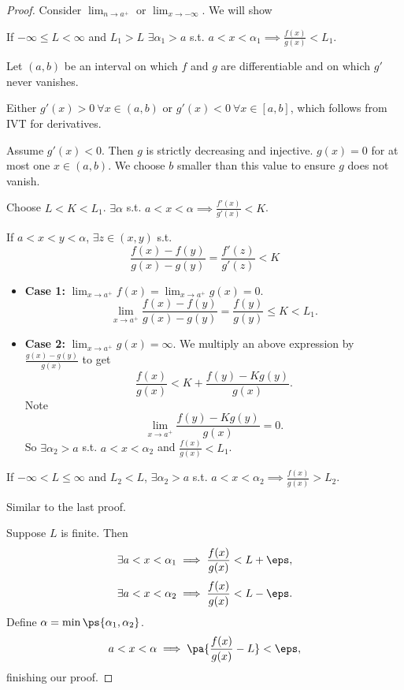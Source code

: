 \documentclass[11pt]{scrartcl}
\numberwithin{equation}{section}
\begin{document}
\begin{proof}
    Consider $\lim_{n\rightarrow a^+}$ or $\lim_{x\rightarrow -\infty}$.
    We will show 
    \begin{claim}
        If $-\infty\leq L< \infty$ and $L_1> L$
        $\exists \alpha_1>a$ s.t. $a<x<\alpha_1 \implies \frac{f(x)}{g(x)}<L_1$.
    \end{claim}
    \begin{subproof}
        Let $(a,b)$ be an interval on which $f$ and $g$ are differentiable
        and on which $g'$ never vanishes.

        Either $g'(x) > 0 \ \forall x\in(a,b)$ or $g'(x) < 0 \ \forall x\in[a,b]$, which follows from IVT for derivatives.

        Assume $g'(x)<0$. Then $g$ is strictly decreasing and injective.
        $g(x) = 0$ for at most one $x\in (a,b)$.
        We choose $b$ smaller than this value to ensure $g$ does not 
        vanish.

        Choose $L<K<L_1$. $\exists \alpha$ s.t. $a<x<\alpha\implies \frac{f'(x)}{g'(x)}<K$.

        If $a<x<y<\alpha$, $\exists z\in(x,y)$ s.t. 
        \[
            \frac{f(x)-f(y)}{g(x)-g(y)} = \frac{f'(z)}{g'(z)} < K
        \]
        \begin{itemize}
            \item \textbf{Case 1:} $\lim_{x\rightarrow a^+}f(x)=\lim_{x\rightarrow a^+}g(x) = 0$.
            \[
                \lim_{x\rightarrow a^+}\frac{f(x)-f(y)}{g(x)-g(y)} = \frac{f(y)}{g(y)} \leq K < L_1.
            \]
            \item \textbf{Case 2:} $\lim_{x\rightarrow a^+}g(x) = \infty$.
            We multiply an above expression by $\frac{g(x)-g(y)}{g(x)}$ to 
            get 
            \[
                \frac{f(x)}{g(x)} < K + \frac{f(y)-Kg(y)}{g(x)}.
            \]
            Note 
            \[
                \lim_{x\rightarrow a^+}\frac{f(y)-Kg(y)}{g(x)} = 0.
            \]
            So $\exists \alpha_2>a$ s.t. $a<x<\alpha_2$ and $\frac{f(x)}{g(x)}<L_1$. \qedhere
        \end{itemize}
    \end{subproof}
    \begin{claim}
        If $-\infty<L\leq\infty$ and $L_2<L$, $\exists \alpha_2>a$ s.t.
        $a < x < \alpha_2 \implies \frac{f(x)}{g(x)}>L_2$.
    \end{claim}
    \begin{subproof}
        Similar to the last proof.
    \end{subproof}
    Suppose $L$ is finite. Then 
    \[
        \exists a< x< \alpha_1 \implies \frac{f(x)}{g(x)}<L+\eps,
    \]
    \[
        \exists a< x< \alpha_2 \implies \frac{f(x)}{g(x)}<L-\eps.
    \]
    Define $\alpha=\min\ps{\alpha_1,\alpha_2}$.
    \[
        a < x < \alpha \implies \pa{\frac{f(x)}{g(x)}-L} < \eps,
    \]
    finishing our proof.
\end{proof}
\clearpage
\end{document}
